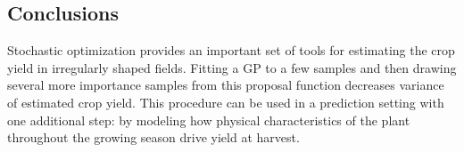 \documentclass[thesis]{hmcposter}
\begin{document}
\begin{poster}
\section{Conclusions}

Stochastic optimization provides an important set of tools for estimating the crop yield in irregularly shaped fields. Fitting a GP to a few samples and then drawing several more importance samples from this proposal function decreases variance of estimated crop yield. This procedure can be used in a prediction setting with one additional step: by modeling how physical characteristics of the plant throughout the growing season drive yield at harvest.







\end{poster}
\end{document}
